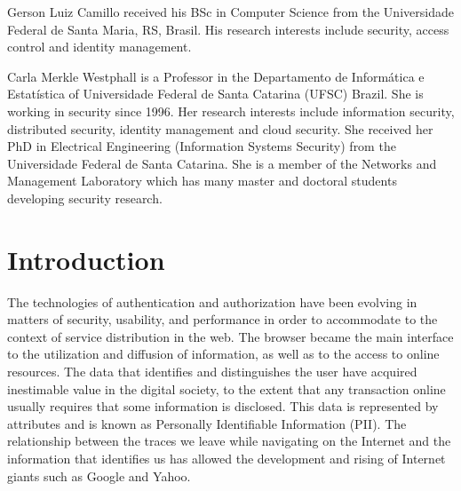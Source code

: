 \documentclass{doublecol-new}
\begin{document}
\begin{bio}
Gerson Luiz Camillo received his BSc in Computer Science from the Universidade Federal de Santa Maria, RS, Brasil. His research interests include security, access control and identity management.

\noindent Carla Merkle Westphall is a Professor in the Departamento de Informática e Estatística of Universidade Federal de Santa Catarina (UFSC) Brazil. She is working in security since 1996. Her research interests include information security, distributed security, identity management and cloud security. She received her PhD in Electrical Engineering (Information Systems Security) from the Universidade Federal de Santa Catarina. She is a member of the Networks and Management Laboratory which has many master and doctoral students developing security research.

\end{bio}

\maketitle

\section{Introduction}

The technologies of authentication and authorization have been evolving in matters of security, usability, and performance in order to accommodate to the context of service distribution in the web. The browser became the main interface to the utilization and diffusion of information, as well as to the access to online resources. The data that identifies and distinguishes the user have acquired inestimable value in the digital society, to the extent that any transaction online usually requires that some information is disclosed. This data is represented by attributes and is known as Personally Identifiable Information (PII). The relationship between the traces we leave while navigating on the Internet and the information that identifies us has allowed the development and rising of Internet giants such as Google and Yahoo.
\end{document}
